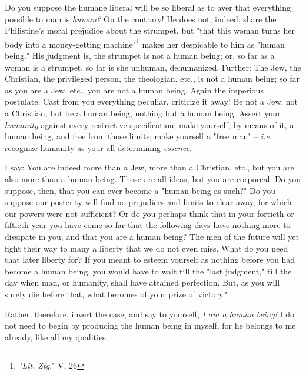 \documentclass[a4paper]{book}
\begin{document}
Do you suppose the humane liberal will be so liberal as to aver that 
everything possible to man is \textit{human?} On the contrary! He does not, 
indeed, share the Philistine's moral prejudice about the strumpet, but "{}that 
this woman turns her body into a money-getting 
machine"{}\footnote{\textit{"{}Lit. Ztg}."{} V, 26} makes her despicable to 
him as "{}human being."{} His judgment is, the strumpet is not a human being; 
or, so far as a woman is a strumpet, so far is she unhuman, dehumanized. 
Further: The Jew, the Christian, the privileged person, the theologian, etc., 
is not a human being; so far as you are a Jew, etc., you are not a human 
being. Again the imperious postulate: Cast from you everything peculiar, 
criticize it away! Be not a Jew, not a Christian, but be a human being, 
nothing but a human being. Assert your \textit{humanity} against every 
restrictive specification; make yourself, by means of it, a human being, and 
free from those limits; make yourself a "{}free man"{} -- \textit{i.e.} 
recognize humanity as your all-determining \textit{essence}.

I say: You are indeed more than a Jew, more than a Christian, etc., but you 
are also more than a human being. Those are all ideas, but you are corporeal. 
Do you suppose, then, that you can ever become a "{}human being as such?"{} Do 
you suppose our posterity will find no prejudices and limits to clear away, 
for which our powers were not sufficient? Or do you perhaps think that in your 
fortieth or fiftieth year you have come so far that the following days have 
nothing more to dissipate in you, and that you are a human being? The men of 
the future will yet fight their way to many a liberty that we do not even 
miss. What do you need that later liberty for? If you meant to esteem yourself 
as nothing before you had become a human being, you would have to wait till 
the "{}last judgment,"{} till the day when man, or humanity, shall have 
attained perfection. But, as you will surely die before that, what becomes of 
your prize of victory?

Rather, therefore, invert the case, and say to yourself, \textit{I am a human 
being!} I do not need to begin by producing the human being in myself, for he 
belongs to me already, like all my qualities.
\end{document}
